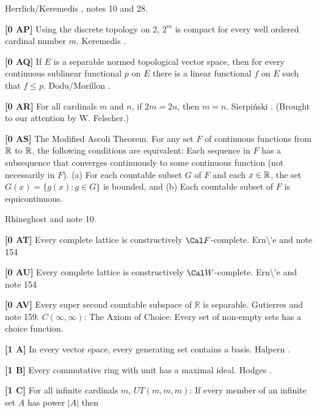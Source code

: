 \ac{Herrlich/Keremedis} \cite{1999a}, notes 10 and 28.
\smallskip
\item{}{\bf [0 AP]} Using the discrete topology on 2, $2^m$ is
compact for every well ordered cardinal number $m$. \ac{Keremedis}
\cite{1999b}.
\smallskip
\item{}{\bf [0 AQ]} If $E$ is a separable normed topological vector
space, then for every continuous sublinear functional $p$ on $E$
there is a linear functional $f$ on $E$ such that $f\leq p$.
\ac{Dodu/Morillon} \cite{1999}.
\smallskip
\item{}{\bf [0 AR]} For all cardinals $m$ and $n$, if $2m=2n$,
then $m=n$. Sierpi\'nski \cite{1922}. (Brought to our attention
by W. Felscher.)
\smallskip
\item{}{\bf [0 AS]} The Modified Ascoli Theorem.  For any set $F$ of
continuous functions from $\Bbb R$ to $\Bbb R$, the following
conditions are equivalent:
 Each sequence in $F$ has a subsequence that
converges continuously to some continuous function (not
necessarily in $F$).
 (a)  For each countable subset $G$ of $F$ and each
$x\in {\Bbb R}$, the set $G(x) = \{ g(x) : g\in G\}$ is bounded,
and
\itemitem{} (b) Each countable subset of $F$ is equicontinuous.\par
\ac{Rhineghost} \cite{2000} and note 10. 
\smallskip
\item{}{\bf [0 AT]} Every complete lattice is constructively $\Cal
F$-complete.  \ac{Ern\'e} \cite{2000} and note 154
\smallskip
\item{}{\bf [0 AU]} Every complete lattice is constructively $\Cal
W$-complete.  \ac{Ern\'e} \cite{2000} and note 154
\smallskip
\item{}{\bf [0 AV]} Every super second countable subspace of $\mathbb R$
is separable.  \ac{Gutierres} \cite{2004} and note 159. 
\medskip
\medskip
{} $C(\infty,\infty)$:  The Axiom of Choice:
Every  set  of  non-empty sets has a choice function.
\smallskip
\item{}{\bf [1 A]} In every vector space, every generating set
contains a basis.  \ac{Halpern} \cite{1966}.
\smallskip
\item{}{\bf [1 B]}  Every commutative ring with unit has a maximal ideal.
\ac{Hodges} \cite{1979}.
\smallskip
\item{}{\bf [1 C]} For all infinite cardinals $m$, $UT(m,m,m)$:
If every member of an infinite set $A$ has power $|A|$ then
